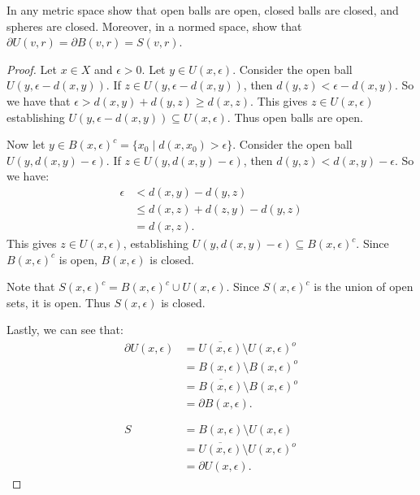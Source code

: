 \documentclass[11pt,twoside,openany]{memoir}
\begin{document}
    \addtocounter{exercise}{1}
    \begin{exercise}
        In any metric space show that open balls are open, closed balls are closed, and spheres are closed. Moreover, in a normed space, show that $\partial U(v,r) = \partial B(v,r) = S(v,r)$.
    \end{exercise}
        \begin{proof}
            Let $x \in X$ and $\epsilon > 0$. Let $y \in U(x,\epsilon)$. Consider the open ball $U(y,\epsilon - d(x,y))$. If $z \in U(y,\epsilon - d(x,y))$, then $d(y,z) < \epsilon - d(x,y)$. So we have that $\epsilon > d(x,y) + d(y,z) \geq d(x,z)$. This gives $z \in U(x,\epsilon)$ establishing $U(y,\epsilon - d(x,y)) \subseteq U(x,\epsilon)$. Thus open balls are open.

            Now let $y \in B(x,\epsilon)^c = \{x_0 \mid d(x,x_0) > \epsilon\}$. Consider the open ball $U(y,d(x,y)-\epsilon)$. If $z \in U(y,d(x,y)-\epsilon)$, then $d(y,z) < d(x,y) - \epsilon$. So we have:
                \begin{equation*}
                \begin{split}
                    \epsilon 
                    & < d(x,y) - d(y,z) \\
                    & \leq d(x,z) + d(z,y) - d(y,z) \\
                    & = d(x,z).
                \end{split}
                \end{equation*}
            This gives $z \in U(x,\epsilon)$, establishing $U(y,d(x,y)-\epsilon) \subseteq  B(x,\epsilon)^c$. Since $B(x,\epsilon)^c$ is open, $B(x,\epsilon)$ is closed.

            Note that $S(x,\epsilon)^c = B(x,\epsilon)^c \cup U(x,\epsilon)$. Since $S(x,\epsilon)^c$ is the union of open sets, it is open. Thus $S(x,\epsilon)$ is closed.

            Lastly, we can see that:
                \begin{equation*}
                \begin{split}
                    \partial U(x,\epsilon) 
                    & = \overline{U(x,\epsilon)} \setminus U(x,\epsilon)^o \\
                    & = B(x,\epsilon) \setminus B(x,\epsilon)^o \\
                    & = \overline{B(x,\epsilon)} \setminus B(x,\epsilon)^o \\
                    & = \partial B(x,\epsilon). \\
                    &\phantom{=} \\
                    S 
                    & = B(x,\epsilon) \setminus U(x,\epsilon) \\
                    & = \overline{U(x,\epsilon)} \setminus U(x,\epsilon)^o \\
                    & = \partial U(x,\epsilon).
                \end{split}
                \end{equation*}
        \end{proof}
\end{document}
